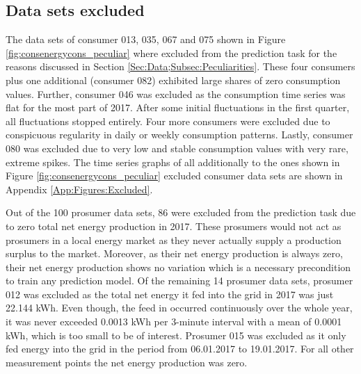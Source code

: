 \subsection{Data sets excluded}\label{Sec:Data;Subsec:Exclusion}
The data sets of consumer 013, 035, 067 and 075 shown in Figure \ref{fig:consenergycons_peculiar} where excluded from the prediction task for the reasons discussed in Section \ref{Sec:Data;Subsec:Peculiarities}. These four consumers plus one additional (consumer 082) exhibited large shares of zero consumption values. Further, consumer 046 was excluded as the consumption time series was flat for the most part of 2017. After some initial fluctuations in the first quarter, all fluctuations stopped entirely. Four more consumers were excluded due to conspicuous regularity in daily or weekly consumption patterns. Lastly, consumer 080 was excluded due to very low and stable consumption values with very rare, extreme spikes. The time series graphs of all additionally to the ones shown in Figure \ref{fig:consenergycons_peculiar} excluded consumer data sets are shown in Appendix \ref{App:Figures:Excluded}.

Out of the 100 prosumer data sets, 86 were excluded from the prediction task due to zero total net energy production in 2017. These prosumers would not act as prosumers in a local energy market as they never actually supply a production surplus to the market. Moreover, as their net energy production is always zero, their net energy production shows no variation which is a necessary precondition to train any prediction model.
Of the remaining 14 prosumer data sets, prosumer 012 was excluded as the total net energy it fed into the grid in 2017 was just 22.144 kWh. Even though, the feed in occurred continuously over the whole year, it was never exceeded 0.0013 kWh per 3-minute interval with a mean of 0.0001 kWh, which is too small to be of interest. Prosumer 015 was excluded as it only fed energy into the grid in the period from 06.01.2017 to 19.01.2017. For all other measurement points the net energy production was zero.



